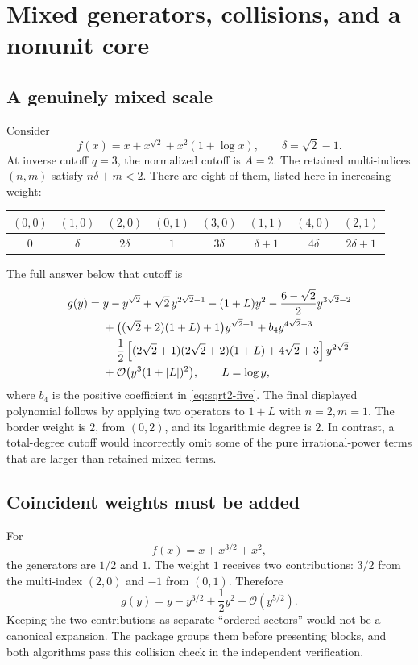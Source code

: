 \documentclass[11pt,a4paper]{article}
\numberwithin{equation}{section}
\theoremstyle{definition}
\newcommand{\OO}{\mathcal O}
\begin{document}
\section{Mixed generators, collisions, and a nonunit core}
\label{sec:mixed}

\subsection{A genuinely mixed scale}
Consider
\[
 f(x)=x+x^{\sqrt2}+x^2(1+\log x),\qquad
 \delta=\sqrt2-1.
\]
At inverse cutoff $q=3$, the normalized cutoff is $A=2$. The retained
multi-indices $(n,m)$ satisfy $n\delta+m<2$. There are eight of them,
listed here in increasing weight:
\begin{center}
\begin{tabular}{cccccccc}
\toprule
$(0,0)$&$(1,0)$&$(2,0)$&$(0,1)$&$(3,0)$&$(1,1)$&$(4,0)$&$(2,1)$\\
\midrule
$0$&$\delta$&$2\delta$&$1$&$3\delta$&$\delta+1$&$4\delta$&$2\delta+1$\\
\bottomrule
\end{tabular}
\end{center}
The full answer below that cutoff is
\begin{align}
 g(y)={}&y-y^{\sqrt2}+\sqrt2\,y^{2\sqrt2-1}
      -(1+L)y^2-\frac{6-\sqrt2}{2}y^{3\sqrt2-2}\notag\\
 &+\bigl((\sqrt2+2)(1+L)+1\bigr)y^{\sqrt2+1}
      +b_4y^{4\sqrt2-3}\notag\\
 &-\frac12\left[(2\sqrt2+1)(2\sqrt2+2)(1+L)
                         +4\sqrt2+3\right]y^{2\sqrt2}\notag\\
 &+\OO\bigl(y^3(1+|L|)^2\bigr),\qquad L=\log y,
 \label{eq:mixed-full}
\end{align}
where $b_4$ is the positive coefficient in \eqref{eq:sqrt2-five}.
The final displayed polynomial follows by applying two operators to
$1+L$ with $n=2,m=1$. The border weight is $2$, from $(0,2)$, and its
logarithmic degree is $2$. In contrast, a total-degree cutoff would
incorrectly omit some of the pure irrational-power terms that are larger
than retained mixed terms.

\subsection{Coincident weights must be added}
For
\[
 f(x)=x+x^{3/2}+x^2,
\]
the generators are $1/2$ and $1$. The weight $1$ receives two
contributions: $3/2$ from the multi-index $(2,0)$ and $-1$ from $(0,1)$.
Therefore
\[
 g(y)=y-y^{3/2}+\frac12y^2+\OO(y^{5/2}).
\]
Keeping the two contributions as separate ``ordered sectors'' would not
be a canonical expansion. The package groups them before presenting
blocks, and both algorithms pass this collision check in the independent
verification.
\end{document}
